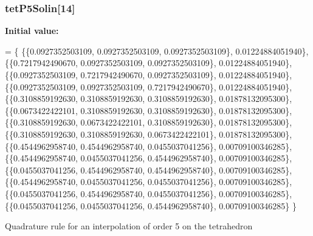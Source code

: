 \subsubsection[{tet\-P5\-Solin}]{ tet\-P5\-Solin[14]}\label{GaussQuadratureTet_8cc_a0a6501abbbb4f9c96fbb9aa05861b911}
{\bfseries Initial value\-:}
\begin{DoxyCode}
= \{
  \{\{0.0927352503109, 0.0927352503109, 0.0927352503109\}, 0.01224884051940\},
  \{\{0.7217942490670, 0.0927352503109, 0.0927352503109\}, 0.01224884051940\},
  \{\{0.0927352503109, 0.7217942490670, 0.0927352503109\}, 0.01224884051940\},
  \{\{0.0927352503109, 0.0927352503109, 0.7217942490670\}, 0.01224884051940\},
  \{\{0.3108859192630, 0.3108859192630, 0.3108859192630\}, 0.01878132095300\},
  \{\{0.0673422422101, 0.3108859192630, 0.3108859192630\}, 0.01878132095300\},
  \{\{0.3108859192630, 0.0673422422101, 0.3108859192630\}, 0.01878132095300\},
  \{\{0.3108859192630, 0.3108859192630, 0.0673422422101\}, 0.01878132095300\},
  \{\{0.4544962958740, 0.4544962958740, 0.0455037041256\}, 0.00709100346285\},
  \{\{0.4544962958740, 0.0455037041256, 0.4544962958740\}, 0.00709100346285\},
  \{\{0.0455037041256, 0.4544962958740, 0.4544962958740\}, 0.00709100346285\},
  \{\{0.4544962958740, 0.0455037041256, 0.0455037041256\}, 0.00709100346285\},
  \{\{0.0455037041256, 0.4544962958740, 0.0455037041256\}, 0.00709100346285\},
  \{\{0.0455037041256, 0.0455037041256, 0.4544962958740\}, 0.00709100346285\}
\}
\end{DoxyCode}
Quadrature rule for an interpolation of order 5 on the tetrahedron 
